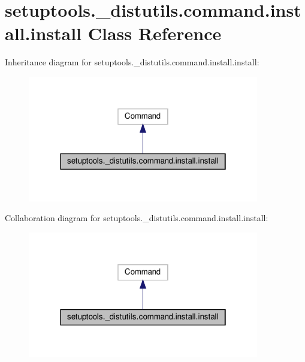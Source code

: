 \hypertarget{classsetuptools_1_1__distutils_1_1command_1_1install_1_1install}{}\section{setuptools.\+\_\+distutils.\+command.\+install.\+install Class Reference}
\label{classsetuptools_1_1__distutils_1_1command_1_1install_1_1install}


Inheritance diagram for setuptools.\+\_\+distutils.\+command.\+install.\+install\+:
\nopagebreak
\begin{figure}[H]
\begin{center}
\leavevmode
\includegraphics[width=286pt]{classsetuptools_1_1__distutils_1_1command_1_1install_1_1install__inherit__graph}
\end{center}
\end{figure}


Collaboration diagram for setuptools.\+\_\+distutils.\+command.\+install.\+install\+:
\nopagebreak
\begin{figure}[H]
\begin{center}
\leavevmode
\includegraphics[width=286pt]{classsetuptools_1_1__distutils_1_1command_1_1install_1_1install__coll__graph}
\end{center}
\end{figure}

